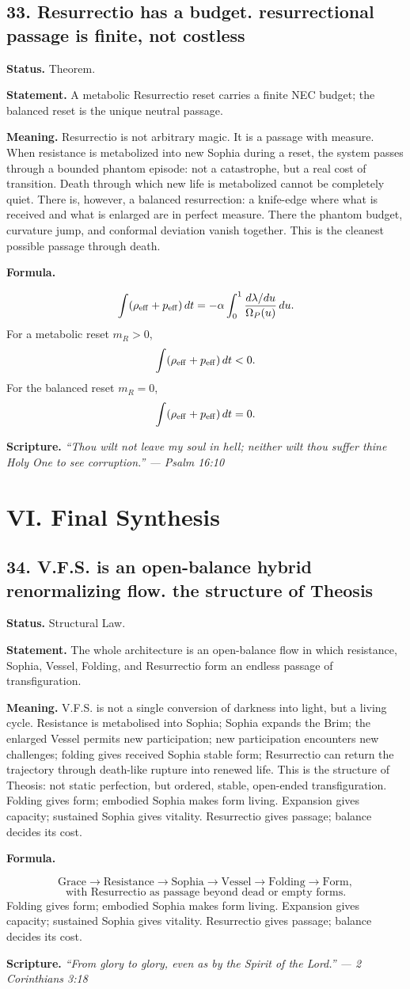 \documentclass[11pt]{article}
\newcommand{\Op}{\Omega_P}
\newcommand{\thesis}[2]{%
  \subsection*{#1. #2}%
}
\newcommand{\status}[1]{\textbf{Status.} #1\par}
\newcommand{\statement}[1]{\textbf{Statement.} #1\par}
\newcommand{\explain}[1]{\textbf{Meaning.} #1\par}
\newcommand{\formula}[1]{\textbf{Formula.}\par #1\par}
\newcommand{\scripture}[2]{\textbf{Scripture.} {\small\itshape ``#1'' --- #2}\par}
\begin{document}
\thesis{33}{Resurrectio has a budget. resurrectional passage is finite, not costless}
\status{Theorem.}
\statement{A metabolic Resurrectio reset carries a finite NEC budget; the balanced reset is the unique neutral passage.}
\explain{Resurrectio is not arbitrary magic. It is a passage with measure. When resistance is metabolized into new Sophia during a reset, the system passes through a bounded phantom episode: not a catastrophe, but a real cost of transition. Death through which new life is metabolized cannot be completely quiet. There is, however, a balanced resurrection: a knife-edge where what is received and what is enlarged are in perfect measure. There the phantom budget, curvature jump, and conformal deviation vanish together. This is the cleanest possible passage through death.}
\formula{\[
  \int(\rho_{\rm eff}+p_{\rm eff})\,dt
  =
  -\alpha\int_0^1\frac{d\lambda/du}{\Op(u)}\,du.
\]
For a metabolic reset \(m_R>0\),
\[
  \int(\rho_{\rm eff}+p_{\rm eff})\,dt<0.
\]
For the balanced reset \(m_R=0\),
\[
  \int(\rho_{\rm eff}+p_{\rm eff})\,dt=0.
\]}
\scripture{Thou wilt not leave my soul in hell; neither wilt thou suffer thine Holy One to see corruption.}{Psalm 16:10}

\section{VI. Final Synthesis}

\thesis{34}{V.F.S. is an open-balance hybrid renormalizing flow. the structure of Theosis}
\status{Structural Law.}
\statement{The whole architecture is an open-balance flow in which resistance, Sophia, Vessel, Folding, and Resurrectio form an endless passage of transfiguration.}
\explain{V.F.S. is not a single conversion of darkness into light, but a living cycle. Resistance is metabolised into Sophia; Sophia expands the Brim; the enlarged Vessel permits new participation; new participation encounters new challenges; folding gives received Sophia stable form; Resurrectio can return the trajectory through death-like rupture into renewed life. This is the structure of Theosis: not static perfection, but ordered, stable, open-ended transfiguration. Folding gives form; embodied Sophia makes form living. Expansion gives capacity; sustained Sophia gives vitality. Resurrectio gives passage; balance decides its cost.}
\formula{\[
  \text{Grace}\to\text{Resistance}\to\text{Sophia}\to\text{Vessel}\to\text{Folding}\to\text{Form},
\]
\[
  \text{with Resurrectio as passage beyond dead or empty forms.}
\]
Folding gives form; embodied Sophia makes form living. Expansion gives capacity; sustained Sophia gives vitality. Resurrectio gives passage; balance decides its cost.}
\scripture{From glory to glory, even as by the Spirit of the Lord.}{2 Corinthians 3:18}
\end{document}
